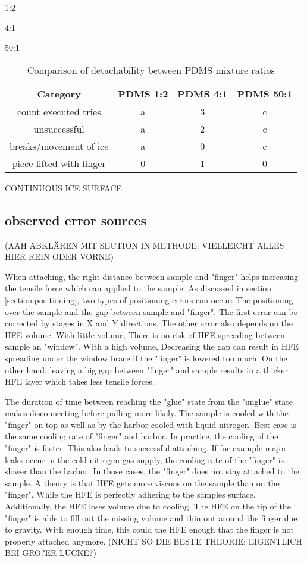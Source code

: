 1:2

4:1

50:1 

\begin{table}
	\centering
	\begin{tabular}{|c|c|c|c|}
		\hline
		Category & PDMS 1:2 & PDMS 4:1 & PDMS 50:1 \\
		\hline
		\hline
		count executed tries & a & 3 & c\\
		\hline
		unsuccessful & a & 2 & c\\
		\hline
		breaks/movement of ice & a & 0 & c\\
		\hline
		piece lifted with finger & 0 & 1 & 0\\
		\hline		
	\end{tabular}
	\caption{Comparison of detachability between PDMS mixture ratios}
	\label{table:AttemptsPDMS}
\end{table}


CONTINUOUS ICE SURFACE

\FloatBarrier

\subsection{observed error sources}

(AAH ABKLÄREN MIT SECTION IN METHODE: VIELLEICHT ALLES HIER REIN ODER VORNE)

When attaching, the right distance between sample and "finger" helps increasing the tensile force which can applied to the sample. As discussed in section \ref{section:positioning}, two types of positioning errors can occur: The positioning over the sample and the gap between sample and "finger". The first error can be corrected by stages in X and Y directions. The other error also depends on the HFE volume. With little volume, There is no risk of HFE spreading between sample an "window". With a high volume, Decreasing the gap can result in HFE spreading under the window brace if the "finger" is lowered too much. On the other hand, leaving a big gap between "finger" and sample results in a thicker HFE layer which takes less tensile forces.

The duration of time between reaching the "glue" state from the "unglue" state makes disconnecting before pulling more likely. The sample is cooled with the "finger" on top as well as by the harbor cooled with liquid nitrogen. Best case is the same cooling rate of "finger" and harbor. In practice, the cooling of the "finger" is faster. This also leads to successful attaching. If for example major leaks occur in the cold nitrogen gas supply, the cooling rate of the "finger" is slower than the harbor. In those cases, the "finger" does not stay attached to the sample. A theory is that HFE gets more viscous on the sample than on the "finger". While the HFE is perfectly adhering to the samples surface. Additionally, the HFE loses volume due to cooling. The HFE on the tip of the "finger" is able to fill out the missing volume and thin out around the finger due to gravity. With enough time, this could the HFE enough that the finger is not properly attached anymore. (NICHT SO DIE BESTE THEORIE; EIGENTLICH BEI GRO?ER LÜCKE?)

